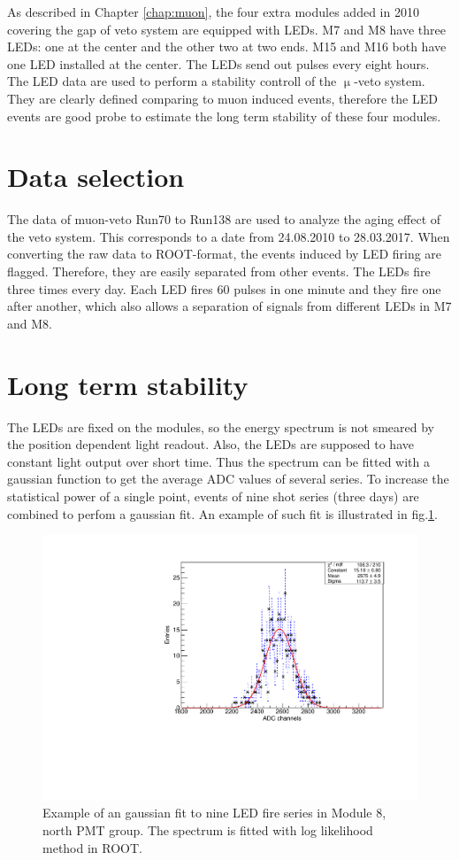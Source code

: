 As described in Chapter \ref{chap:muon}, the four extra modules added in 2010 covering the gap of veto system are equipped with LEDs. M7 and M8 have three LEDs: one at the center and the other two at two ends. M15 and M16 both have one LED installed at the center. The LEDs send out pulses every eight hours. The LED data are used to perform a stability controll of the $\upmu$-veto system. They are clearly defined comparing to muon induced events, therefore the LED events are good probe to estimate the long term stability of these four modules.
\section{Data selection}
The data of muon-veto Run70 to Run138 are used to analyze the aging effect of the veto system. This corresponds to a date from 24.08.2010 to 28.03.2017. When converting the raw data to ROOT-format, the events induced by LED firing are flagged. Therefore, they are easily separated from other events.
The LEDs fire three times every day. Each LED fires 60 pulses in one minute and they fire one after another, which also allows a separation of signals from different LEDs in M7 and M8.



\section{Long term stability}
The LEDs are fixed on the modules, so the energy spectrum is not smeared by the position dependent light readout. Also, the LEDs are supposed to have constant light output over short time. Thus the spectrum can be fitted with a gaussian function to get the average ADC values of several series.
To increase the statistical power of a single point, events of nine shot series (three days) are combined to perfom a gaussian fit. An example of such fit is illustrated in fig.\ref{fig:gaussian-fit}.

\begin{figure}[ht!]
  \centering
  \includegraphics[width=0.6\textwidth{}]{./fig/gaussianM8.pdf}
  \caption{Example of an gaussian fit to nine LED fire series in Module 8, north PMT group. The spectrum is fitted with log likelihood method in ROOT.}
  \label{fig:gaussian-fit}
\end{figure}

